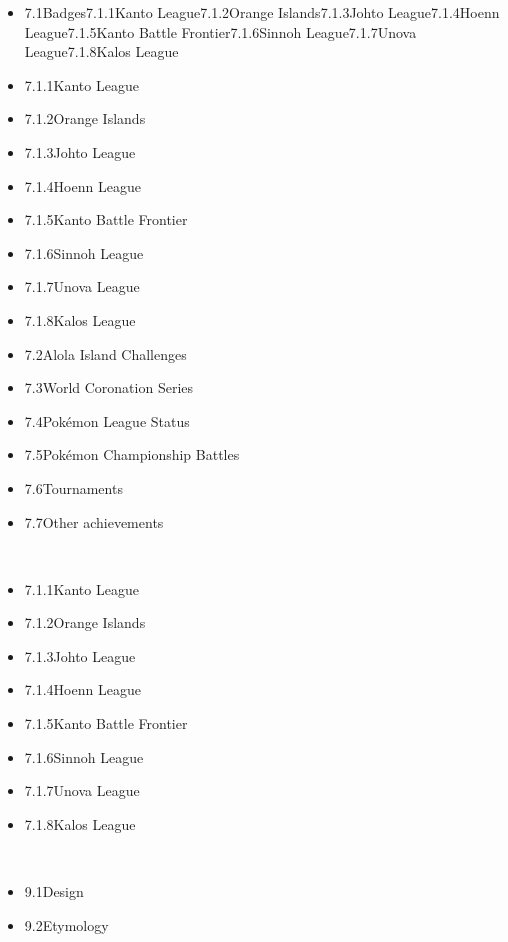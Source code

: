 \documentclass[a4paper,12pt]{article}
\begin{document}
\begin{itemize}
\item 7.1Badges7.1.1Kanto League7.1.2Orange Islands7.1.3Johto League7.1.4Hoenn League7.1.5Kanto Battle Frontier7.1.6Sinnoh League7.1.7Unova League7.1.8Kalos League
\item 7.1.1Kanto League
\item 7.1.2Orange Islands
\item 7.1.3Johto League
\item 7.1.4Hoenn League
\item 7.1.5Kanto Battle Frontier
\item 7.1.6Sinnoh League
\item 7.1.7Unova League
\item 7.1.8Kalos League
\item 7.2Alola Island Challenges
\item 7.3World Coronation Series
\item 7.4Pokémon League Status
\item 7.5Pokémon Championship Battles
\item 7.6Tournaments
\item 7.7Other achievements
\end{itemize}\\ \par \vspace{0.5cm}

\begin{itemize}
\item 7.1.1Kanto League
\item 7.1.2Orange Islands
\item 7.1.3Johto League
\item 7.1.4Hoenn League
\item 7.1.5Kanto Battle Frontier
\item 7.1.6Sinnoh League
\item 7.1.7Unova League
\item 7.1.8Kalos League
\end{itemize}\\ \par \vspace{0.5cm}

\begin{itemize}
\item 9.1Design
\item 9.2Etymology
\end{itemize}\\ \par \vspace{0.5cm}
\end{document}
